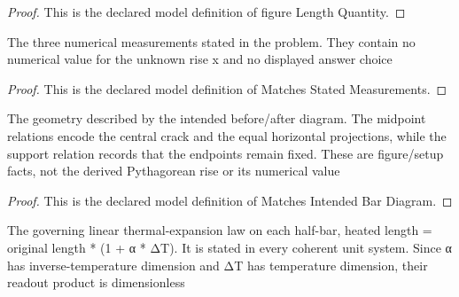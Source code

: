 \begin{proof}
  This is the declared model definition of figure Length Quantity.
\end{proof}
\begin{definition}
  \label{def:physics:phyx-mini-0154:phyxminiproblems-problemphyxmini0154-matchesstatedmeasurements}
  The three numerical measurements stated in the problem. They contain no numerical value for the unknown rise x and no displayed answer choice
\end{definition}
\begin{proof}
  This is the declared model definition of Matches Stated Measurements.
\end{proof}
\begin{definition}
  \label{def:physics:phyx-mini-0154:phyxminiproblems-problemphyxmini0154-matchesintendedbardiagram}
  The geometry described by the intended before/after diagram. The midpoint relations encode the central crack and the equal horizontal projections, while the support relation records that the endpoints remain fixed. These are figure/setup facts, not the derived Pythagorean rise or its numerical value
\end{definition}
\begin{proof}
  This is the declared model definition of Matches Intended Bar Diagram.
\end{proof}
\begin{definition}
  \label{def:physics:phyx-mini-0154:phyxminiproblems-problemphyxmini0154-obeyslinearthermalexpansion}
  The governing linear thermal-expansion law on each half-bar, heated length = original length * (1 + α * ΔT). It is stated in every coherent unit system. Since α has inverse-temperature dimension and ΔT has temperature dimension, their readout product is dimensionless
\end{definition}
